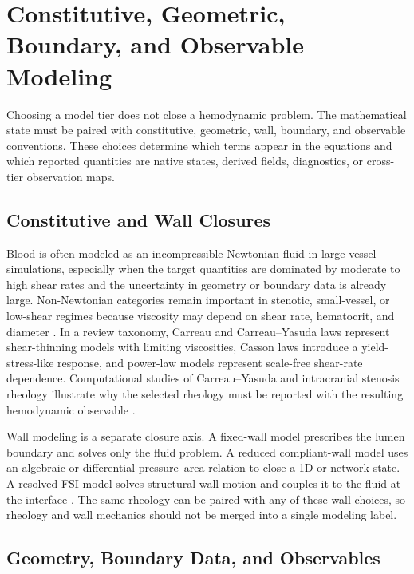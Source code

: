\section{Constitutive, Geometric, Boundary, and Observable Modeling}
\label{sec:modeling-closures}
\label{sec:modeling-closures-observables}

Choosing a model tier does not close a hemodynamic problem. The mathematical
state must be paired with constitutive, geometric, wall, boundary, and
observable conventions. These choices determine which terms appear in the
equations and which reported quantities are native states, derived fields,
diagnostics, or cross-tier observation maps.

\subsection{Constitutive and Wall Closures}
\label{subsec:constitutive-wall-closures}

Blood is often modeled as an incompressible Newtonian fluid in large-vessel
simulations, especially when the target quantities are dominated by moderate to
high shear rates and the uncertainty in geometry or boundary data is already
large. Non-Newtonian categories remain important in stenotic, small-vessel, or
low-shear regimes because viscosity may depend on shear rate, hematocrit, and
diameter \cite{PriesEtAl1992BloodViscosityTubeFlow}. In a review taxonomy,
Carreau and Carreau--Yasuda laws represent shear-thinning models with limiting
viscosities, Casson laws introduce a yield-stress-like response, and power-law
models represent scale-free shear-rate dependence. Computational studies of
Carreau--Yasuda and intracranial stenosis rheology illustrate why the selected
rheology must be reported with the resulting hemodynamic observable
\cite{KumarEtAl2019CarreauYasudaHemodynamics,LiuEtAl2021ICASRheology}.

Wall modeling is a separate closure axis. A fixed-wall model prescribes the
lumen boundary and solves only the fluid problem. A reduced compliant-wall model
uses an algebraic or differential pressure--area relation to close a 1D or
network state. A resolved FSI model solves structural wall motion and couples it
to the fluid at the interface
\cite{FormaggiaEtAl2003OneDimensionalBloodFlow,FormaggiaEtAl2007FSICoupling}.
The same rheology can be paired with any of these wall choices, so rheology and
wall mechanics should not be merged into a single modeling label.

\subsection{Geometry, Boundary Data, and Observables}
\label{subsec:geometry-boundary-observable-closures}

